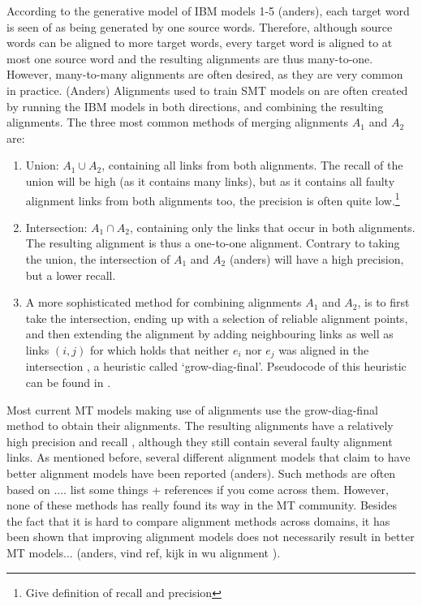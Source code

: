 \documentclass{report}
\theoremstyle{definition}
\theoremstyle{plain}
\begin{document}
According to the generative model of IBM models 1-5 (anders), each target word is seen of as being generated by one source words. Therefore, although source words can be aligned to more target words, every target word is aligned to at most one source word and the resulting alignments are thus many-to-one. However, many-to-many alignments are often desired, as they are very common in practice. (Anders) Alignments used to train SMT models on are often created by running the IBM models in both directions, and combining the resulting alignments. The three most common methods of merging alignments $A_1$ and $A_2$ are:\begin{enumerate}
\item Union: $A_1\cup A_2$, containing all links from both alignments. The recall of the union will be high (as it contains many links), but as it contains all faulty alignment links from both alignments too, the precision is often quite low.\footnote{Give definition of recall and precision}
\item Intersection: $A_1\cap A_2$, containing only the links that occur in both alignments. The resulting alignment is thus a one-to-one alignment. Contrary to taking the union, the intersection of $A_1$ and $A_2$ (anders) will have a high precision, but a lower recall.
\item A more sophisticated method for combining alignments $A_1$ and $A_2$, is to first take the intersection, ending up with a selection of reliable alignment points, and then extending the alignment by adding neighbouring links as well as links $(i,j)$ for which holds that neither $e_i$ nor $e_j$ was aligned in the intersection \citep{och2000improved}, a heuristic called `grow-diag-final'. Pseudocode of this heuristic can be found in \cite{koehn2008statistical}.
\end{enumerate}

Most current MT models making use of alignments use the grow-diag-final method to obtain their alignments. The resulting alignments have a relatively high precision and recall \citep{och2000improved}, although they still contain several faulty alignment links. As mentioned before, several different alignment models that claim to have better alignment models have been reported (anders). Such methods are often based on .... list some things + references if you come across them. However, none of these methods has really found its way in the MT community. Besides the fact that it is hard to compare alignment methods across domains, it has been shown that improving alignment models does not necessarily result in better MT models... (anders, vind ref, kijk in wu alignment \cite{indurkhya2010handbook}).
\end{document}
